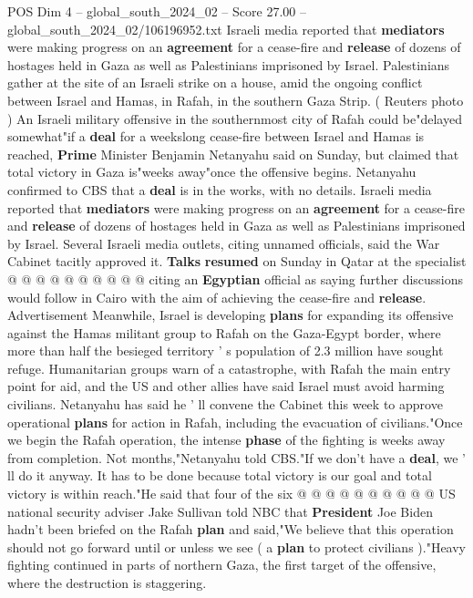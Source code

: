 \begin{textsample}{POS Dim 4 – global\_south\_2024\_02 – Score 27.00 – global\_south\_2024\_02/106196952.txt}  \label{ex:f4_pos_073}
Israeli media reported that \textbf{mediators} were making progress on an \textbf{agreement} for a cease-fire and \textbf{release} of dozens of hostages held in Gaza as well as Palestinians imprisoned by Israel.
Palestinians gather at the site of an Israeli strike on a house, amid the ongoing conflict between Israel and Hamas, in Rafah, in the southern Gaza Strip. ( Reuters photo ) An Israeli military offensive in the southernmost city of Rafah could be"delayed somewhat"if a \textbf{deal} for a weekslong cease-fire between Israel and Hamas is reached, \textbf{Prime} Minister Benjamin Netanyahu said on Sunday, but claimed that total victory in Gaza is"weeks away"once the offensive begins.
Netanyahu confirmed to CBS that a \textbf{deal} is in the works, with no details.
Israeli media reported that \textbf{mediators} were making progress on an \textbf{agreement} for a cease-fire and \textbf{release} of dozens of hostages held in Gaza as well as Palestinians imprisoned by Israel.
Several Israeli media outlets, citing unnamed officials, said the War Cabinet tacitly approved it. \textbf{Talks} \textbf{resumed} on Sunday in Qatar at the specialist @ @ @ @ @ @ @ @ @ @ citing an \textbf{Egyptian} official as saying further discussions would follow in Cairo with the aim of achieving the cease-fire and \textbf{release}.
Advertisement Meanwhile, Israel is developing \textbf{plans} for expanding its offensive against the Hamas militant group to Rafah on the Gaza-Egypt border, where more than half the besieged territory ' s population of 2.3 million have sought refuge.
Humanitarian groups warn of a catastrophe, with Rafah the main entry point for aid, and the US and other allies have said Israel must avoid harming civilians.
Netanyahu has said he ' ll convene the Cabinet this week to approve operational \textbf{plans} for action in Rafah, including the evacuation of civilians."Once we begin the Rafah operation, the intense \textbf{phase} of the fighting is weeks away from completion.
Not months,"Netanyahu told CBS."If we don't have a \textbf{deal}, we ' ll do it anyway.
It has to be done because total victory is our goal and total victory is within reach."He said that four of the six @ @ @ @ @ @ @ @ @ @ US national security adviser Jake Sullivan told NBC that \textbf{President} Joe Biden hadn't been briefed on the Rafah \textbf{plan} and said,"We believe that this operation should not go forward until or unless we see ( a \textbf{plan} to protect civilians )."Heavy fighting continued in parts of northern Gaza, the first target of the offensive, where the destruction is staggering.

\end{textsample}
